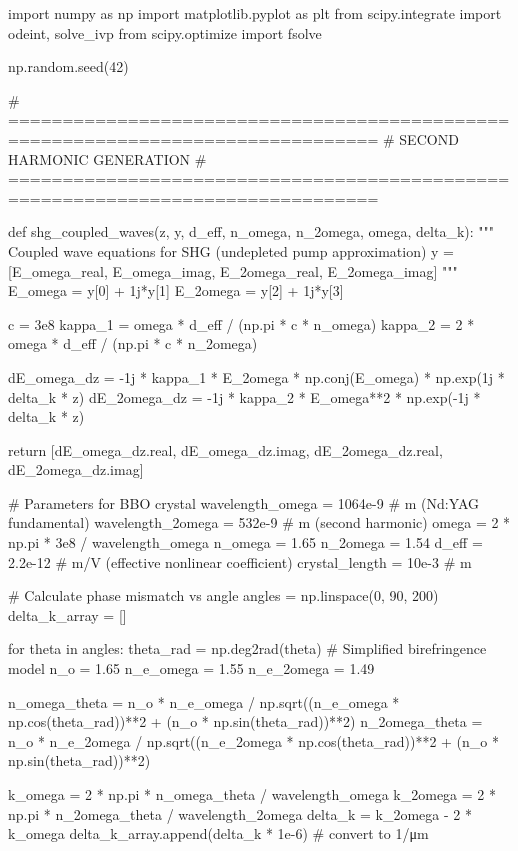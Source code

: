 \documentclass[a4paper, 11pt]{article}
\begin{document}
\begin{pycode}
import numpy as np
import matplotlib.pyplot as plt
from scipy.integrate import odeint, solve_ivp
from scipy.optimize import fsolve

np.random.seed(42)

# ================================================================================
# SECOND HARMONIC GENERATION
# ================================================================================

def shg_coupled_waves(z, y, d_eff, n_omega, n_2omega, omega, delta_k):
    """
    Coupled wave equations for SHG (undepleted pump approximation)
    y = [E_omega_real, E_omega_imag, E_2omega_real, E_2omega_imag]
    """
    E_omega = y[0] + 1j*y[1]
    E_2omega = y[2] + 1j*y[3]

    c = 3e8
    kappa_1 = omega * d_eff / (np.pi * c * n_omega)
    kappa_2 = 2 * omega * d_eff / (np.pi * c * n_2omega)

    dE_omega_dz = -1j * kappa_1 * E_2omega * np.conj(E_omega) * np.exp(1j * delta_k * z)
    dE_2omega_dz = -1j * kappa_2 * E_omega**2 * np.exp(-1j * delta_k * z)

    return [dE_omega_dz.real, dE_omega_dz.imag, dE_2omega_dz.real, dE_2omega_dz.imag]

# Parameters for BBO crystal
wavelength_omega = 1064e-9  # m (Nd:YAG fundamental)
wavelength_2omega = 532e-9  # m (second harmonic)
omega = 2 * np.pi * 3e8 / wavelength_omega
n_omega = 1.65
n_2omega = 1.54
d_eff = 2.2e-12  # m/V (effective nonlinear coefficient)
crystal_length = 10e-3  # m

# Calculate phase mismatch vs angle
angles = np.linspace(0, 90, 200)
delta_k_array = []

for theta in angles:
    theta_rad = np.deg2rad(theta)
    # Simplified birefringence model
    n_o = 1.65
    n_e_omega = 1.55
    n_e_2omega = 1.49

    n_omega_theta = n_o * n_e_omega / np.sqrt((n_e_omega * np.cos(theta_rad))**2 +
                                              (n_o * np.sin(theta_rad))**2)
    n_2omega_theta = n_o * n_e_2omega / np.sqrt((n_e_2omega * np.cos(theta_rad))**2 +
                                                (n_o * np.sin(theta_rad))**2)

    k_omega = 2 * np.pi * n_omega_theta / wavelength_omega
    k_2omega = 2 * np.pi * n_2omega_theta / wavelength_2omega
    delta_k = k_2omega - 2 * k_omega
    delta_k_array.append(delta_k * 1e-6)  # convert to 1/μm


\end{pycode}
\end{document}
